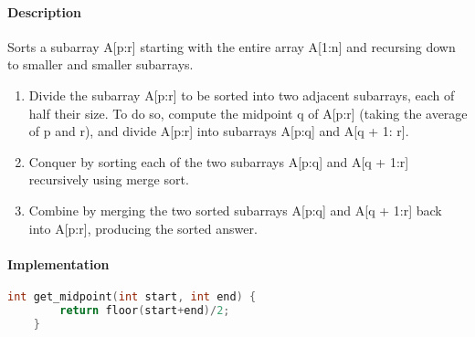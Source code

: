 \documentclass[12pt, letterpaper]{article}
\begin{document}
\paragraph{Description}
Sorts a subarray A[p:r] starting with the entire array A[1:n] and recursing 
down to smaller and smaller subarrays. 
\begin{enumerate}
	\item Divide the subarray A[p:r] to be sorted into two adjacent subarrays, 
		each of half their size. To do so, compute the midpoint q of A[p:r]
		(taking the average of p and r), and divide A[p:r] into subarrays A[p:q]
		and A[q + 1: r]. 
	\item Conquer by sorting each of the two subarrays A[p:q] and A[q + 1:r]
		recursively using merge sort. 
	\item Combine by merging the two sorted subarrays A[p:q] and A[q + 1:r] back
		into A[p:r], producing the sorted answer. 
\end{enumerate}

\paragraph{Implementation}
\begin{lstlisting}[language=C] 
	int get_midpoint(int start, int end) {
		return floor(start+end)/2; 
	}
\end{lstlisting}
\end{document}
